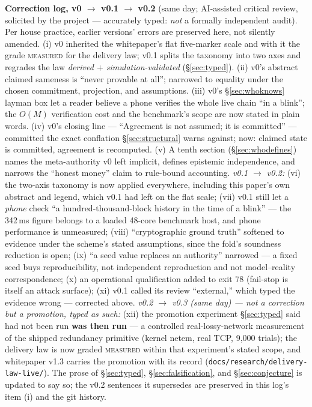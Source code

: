 \documentclass[10pt,a4paper]{article}
\begin{document}
\vspace{4pt}
\begin{tcolorbox}[colback=panelbg,colframe=slate,boxrule=0.6pt,arc=2pt,
                  left=9pt,right=9pt,top=7pt,bottom=7pt]
\small\textbf{Correction log, v0 $\to$ v0.1 $\to$ v0.2} (same day; AI-assisted
critical review, solicited by the project — accurately typed: \emph{not} a formally
independent audit). Per house practice, earlier versions' errors are preserved
here, not silently amended. (i) v0 inherited
the whitepaper's flat five-marker scale and with it the grade \textsc{measured} for
the delivery law; v0.1 splits the taxonomy into two axes and regrades the law
\emph{derived $+$ simulation-validated} (\S\ref{sec:typed}). (ii) v0's abstract
claimed sameness is ``never provable at all''; narrowed to equality under the
chosen commitment, projection, and assumptions. (iii) v0's \S\ref{sec:whoknows}
layman box let a reader believe a phone verifies the whole live chain ``in a
blink''; the $O(M)$ verification cost and the benchmark's scope are now stated in
plain words. (iv) v0's closing line — ``Agreement is not assumed; it is
committed'' — committed the exact conflation \S\ref{sec:structural} warns against;
now: claimed state is committed, agreement is recomputed. (v) A tenth section
(\S\ref{sec:whodefines}) names the meta-authority v0 left implicit, defines
epistemic independence, and narrows the ``honest money'' claim to rule-bound
accounting. \emph{v0.1 $\to$ v0.2:} (vi) the two-axis taxonomy is now applied
everywhere, including this paper's own abstract and legend, which v0.1 had left
on the flat scale; (vii) v0.1 still let a \emph{phone} check ``a
hundred-thousand-block history in the time of a blink'' — the 342\,ms figure
belongs to a loaded 48-core benchmark host, and phone performance is unmeasured;
(viii) ``cryptographic ground truth'' softened to evidence under the scheme's
stated assumptions, since the fold's soundness reduction is open; (ix) ``a seed
value replaces an authority'' narrowed — a fixed seed buys reproducibility, not
independent reproduction and not model--reality correspondence; (x) an
operational qualification added to exit 78 (fail-stop is itself an attack
surface); (xi) v0.1 called its review ``external,'' which typed the evidence
wrong — corrected above. \emph{v0.2 $\to$ v0.3 (same day) — not a correction but a
promotion, typed as such:} (xii) the promotion experiment \S\ref{sec:typed} said
had not been run \textbf{was then run} — a controlled real-lossy-network
measurement of the shipped redundancy primitive (kernel netem, real TCP, 9{,}000
trials); the delivery law is now graded \textsc{measured} within that experiment's
stated scope, and whitepaper v1.3 carries the promotion with its record
(\texttt{docs/research/delivery-law-live/}). The prose of \S\ref{sec:typed},
\S\ref{sec:falsification}, and \S\ref{sec:conjecture} is updated to say so; the
v0.2 sentences it supersedes are preserved in this log's item (i) and the git
history.
\end{tcolorbox}
\end{document}
